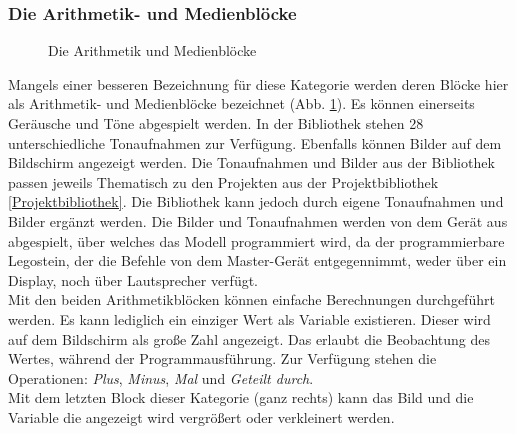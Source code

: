\subsubsection{Die Arithmetik- und Medienblöcke}
\begin{figure}[htbp!]
	\centering
	\caption[Die Arithmetik und Medienblöcke]{Die Arithmetik und Medienblöcke} %
	\label{img:ArithmetikUndMedienblöcke}
\end{figure}
Mangels einer besseren Bezeichnung für diese Kategorie werden deren Blöcke hier als  Arithmetik- und Medienblöcke bezeichnet (Abb. \ref{img:ArithmetikUndMedienblöcke}). Es können einerseits Geräusche und Töne abgespielt werden. In der Bibliothek stehen 28 unterschiedliche Tonaufnahmen zur Verfügung. Ebenfalls können Bilder auf dem Bildschirm angezeigt werden. Die Tonaufnahmen und Bilder aus der Bibliothek passen jeweils Thematisch zu den Projekten aus der Projektbibliothek \ref{Projektbibliothek}. Die Bibliothek kann jedoch durch eigene Tonaufnahmen und Bilder ergänzt werden. Die Bilder und Tonaufnahmen werden von dem Gerät aus abgespielt, über welches das Modell programmiert wird, da der programmierbare Legostein, der die Befehle von dem Master-Gerät entgegennimmt, weder über ein Display, noch über Lautsprecher verfügt.\\
Mit den beiden Arithmetikblöcken können einfache Berechnungen durchgeführt werden. Es kann lediglich ein einziger Wert als Variable existieren. Dieser wird auf dem Bildschirm als große Zahl angezeigt. Das erlaubt die Beobachtung des Wertes, während der Programmausführung. Zur Verfügung stehen die Operationen: \textit{Plus}, \textit{Minus}, \textit{Mal} und \textit{Geteilt durch}.\\
Mit dem letzten Block dieser Kategorie (ganz rechts) kann das Bild und die Variable die angezeigt wird vergrößert oder verkleinert werden.

